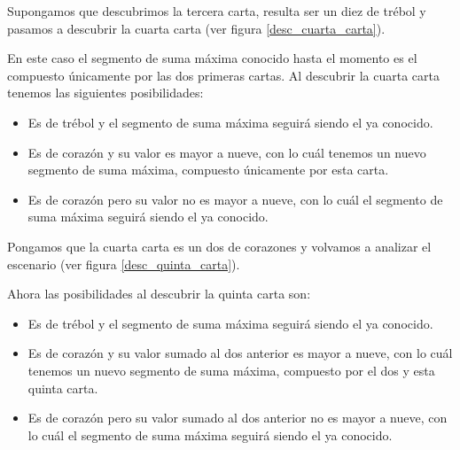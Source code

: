 \documentclass[12pt, a4paper, openany, fleqn]{book}
\newif\ifUsePstPoker
\begin{document}
    Supongamos que descubrimos la tercera carta, resulta ser un diez de trébol y pasamos a descubrir la cuarta carta (ver figura \ref{desc_cuarta_carta}).

    \ifUsePstPoker
        \begin{figure}[h]
            \centering
            \psset{framebg=beige}\crdsevh
            \psset{framebg=beige}\crdtwoh
            \psset{framebg=beige}\crdtenc
            \psset{backcolor=red}\crdback
            \psset{backcolor=red}\crdback
            \rput(-4.8,-1){\textbf{\^}} %

            \caption{Descubriendo la cuarta carta} \label{desc_cuarta_carta}
        \end{figure}
    \fi

    \noindent En este caso el segmento de suma máxima conocido hasta el momento es el compuesto únicamente por las dos primeras cartas. Al descubrir la cuarta carta tenemos las siguientes posibilidades:
    \begin{itemize}
        \item Es de trébol y el segmento de suma máxima seguirá siendo el ya conocido.
        \item Es de corazón y su valor es mayor a nueve, con lo cuál tenemos un nuevo segmento de suma máxima, compuesto únicamente por esta carta.
        \item Es de corazón pero su valor no es mayor a nueve, con lo cuál el segmento de suma máxima seguirá siendo el ya conocido.
    \end{itemize}

    Pongamos que la cuarta carta es un dos de corazones y volvamos a analizar el escenario (ver figura \ref{desc_quinta_carta}).

    \ifUsePstPoker
        \begin{figure}[h]
            \centering
            \psset{framebg=beige}\crdsevh
            \psset{framebg=beige}\crdtwoh
            \psset{framebg=beige}\crdtenc
            \psset{framebg=beige}\crdtwoh
            \psset{backcolor=red}\crdback
            \rput(-1.8,-1){\textbf{\^}} %

            \caption{Descubriendo la quinta carta} \label{desc_quinta_carta}
        \end{figure}
    \fi

    Ahora las posibilidades al descubrir la quinta carta son:
    \begin{itemize}
        \item Es de trébol y el segmento de suma máxima seguirá siendo el ya conocido.
        \item Es de corazón y su valor sumado al dos anterior es mayor a nueve, con lo cuál tenemos un nuevo segmento de suma máxima, compuesto por el dos y esta quinta carta.
        \item Es de corazón pero su valor sumado al dos anterior no es mayor a nueve, con lo cuál el segmento de suma máxima seguirá siendo el ya conocido.
    \end{itemize}
\end{document}
